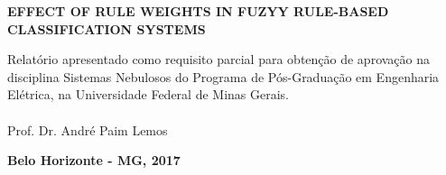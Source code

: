 \documentclass[12pt,a4paper]{article}
\numberwithin{equation}{section}
\begin{document}
\vspace{25 mm}
\begin{center}
\textbf{EFFECT OF RULE WEIGHTS IN FUZYY RULE-BASED CLASSIFICATION SYSTEMS}\\
\end{center}

\vspace{30 mm}

\vspace{35mm}
\hspace{8cm}\begin{minipage}[r]{0.45\linewidth}
Relatório apresentado como requisito parcial para obtenção de aprovação na disciplina Sistemas Nebulosos do Programa de Pós-Graduação em Engenharia Elétrica, na Universidade Federal de Minas Gerais.\\ 
\\
Prof. Dr. André Paim Lemos
\end{minipage}

\vspace{50mm}
\begin{center}
\textbf{Belo Horizonte - MG, 2017}
\end{center}

\thispagestyle{empty}
\newpage
\tableofcontents
\newpage
\listoffigures
\newpage
{}
\end{document}
